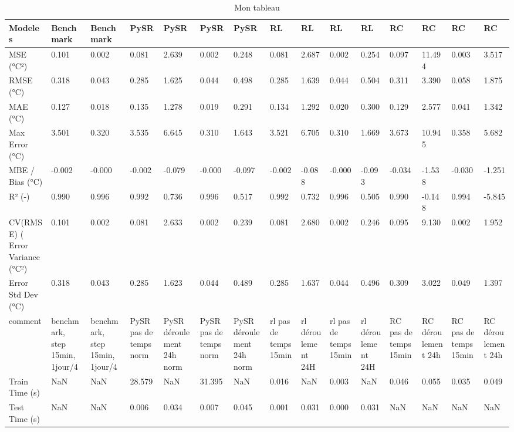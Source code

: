 \begin{table}
\caption{Mon tableau}
\label{tab:mon_tableau}
\begin{tabular}{lllllllllllllll}
\toprule
Modeles & Benchmark & Benchmark & PySR & PySR & PySR & PySR & RL & RL & RL & RL & RC & RC & RC & RC \\
\midrule
MSE (°C²) & 0.101 & 0.002 & 0.081 & 2.639 & 0.002 & 0.248 & 0.081 & 2.687 & 0.002 & 0.254 & 0.097 & 11.494 & 0.003 & 3.517 \\
RMSE (°C) & 0.318 & 0.043 & 0.285 & 1.625 & 0.044 & 0.498 & 0.285 & 1.639 & 0.044 & 0.504 & 0.311 & 3.390 & 0.058 & 1.875 \\
MAE (°C) & 0.127 & 0.018 & 0.135 & 1.278 & 0.019 & 0.291 & 0.134 & 1.292 & 0.020 & 0.300 & 0.129 & 2.577 & 0.041 & 1.342 \\
Max Error (°C) & 3.501 & 0.320 & 3.535 & 6.645 & 0.310 & 1.643 & 3.521 & 6.705 & 0.310 & 1.669 & 3.673 & 10.945 & 0.358 & 5.682 \\
MBE / Bias (°C) & -0.002 & -0.000 & -0.002 & -0.079 & -0.000 & -0.097 & -0.002 & -0.088 & -0.000 & -0.093 & -0.034 & -1.538 & -0.030 & -1.251 \\
R² (-) & 0.990 & 0.996 & 0.992 & 0.736 & 0.996 & 0.517 & 0.992 & 0.732 & 0.996 & 0.505 & 0.990 & -0.148 & 0.994 & -5.845 \\
CV(RMSE) (%
Error Variance (°C²) & 0.101 & 0.002 & 0.081 & 2.633 & 0.002 & 0.239 & 0.081 & 2.680 & 0.002 & 0.246 & 0.095 & 9.130 & 0.002 & 1.952 \\
Error Std Dev (°C) & 0.318 & 0.043 & 0.285 & 1.623 & 0.044 & 0.489 & 0.285 & 1.637 & 0.044 & 0.496 & 0.309 & 3.022 & 0.049 & 1.397 \\
comment & benchmark, step 15min, 1jour/4 & benchmark, step 15min, 1jour/4 & PySR pas de temps norm & PySR déroulement 24h norm & PySR pas de temps norm & PySR déroulement 24h norm & rl pas de temps 15min & rl déroulement 24H & rl pas de temps 15min & rl déroulement 24H & RC pas de temps 15min & RC déroulement 24h & RC pas de temps 15min & RC déroulement 24h \\
Train Time (s) & NaN & NaN & 28.579 & NaN & 31.395 & NaN & 0.016 & NaN & 0.003 & NaN & 0.046 & 0.055 & 0.035 & 0.049 \\
Test Time (s) & NaN & NaN & 0.006 & 0.034 & 0.007 & 0.045 & 0.001 & 0.031 & 0.000 & 0.031 & NaN & NaN & NaN & NaN \\
\bottomrule
\end{tabular}
\end{table}
